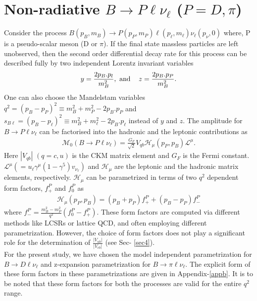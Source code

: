 \documentclass[a4paper,11pt]{article}
\begin{document}
\section{Non-radiative $B\to P\ell\nu_{\ell}$ ($P=D,\pi$)}
	\label{sec2}
	Consider the process $B(p_{B},m_{B})\to P(p_{P},m_{P}) \ell(p_{\ell},m_{\ell}) \nu_{\ell}(p_{\nu},0)$ where, P is a pseudo-scalar meson (D or $\pi$). If the final state massless particles are left unobserved, then the second order differential decay rate for this process can be described fully by two independent Lorentz invariant variables
	\begin{eqnarray}
	y=\frac{2 p_{B}.p_{l}}{m_{B}^{2}}, \text{  and  }\hspace{0.3cm}  z=\frac{2 p_{B}.p_{P}}{m_{B}^{2}}.
	\label{eqn1}
	\end{eqnarray}
	One can also choose the Mandelstam variables $q^{2}=(p_{B}-p_{P})^{2}\equiv m_{B}^{2}+m_{P}^{2}-2 p_{B}.p_{P}$ and $s_{B\ell}=(p_{B}-p_{\ell})^{2}\equiv m_{B}^{2}+m_{\ell}^{2}-2 p_{B}.p_{\ell}$ instead of $y$ and $z$. The amplitude for $B\rightarrow P \ell \nu_\ell $ can be factorised into the hadronic and the leptonic contributions as
	\begin{eqnarray}
	\mathcal{M}_{0}(B\to P\ell\nu_{\ell})=\frac{G_{F}}{\sqrt{2}}V_{qb}\mathcal{H}_{\mu}(p_{P},p_{B})\mathcal{L}^{\mu} .
	\end{eqnarray}
	Here $|V_{qb}|$ $(q={c,u})$ is the CKM matrix element and $G_{F}$ is the Fermi constant. $\mathcal{L}^{\mu}(=u_{\ell}\gamma^{\mu}(1-\gamma^{5})v_{\nu_{\ell}})$ and $\mathcal{H}_\mu$ are the leptonic and the hadronic matrix elements, respectively. $\mathcal{H}_{\mu}$ can be parametrized in terms of two $q^{2}$ dependent form factors, $f_{+}^{P}$ and $f_{0}^{P}$ as
	\begin{eqnarray}
	\mathcal{H}_{\mu}(p_{P},p_{B})=(p_{B}+p_{P}) f_{+}^{P} +(p_{B} - p_{P}) f_{-}^{P}
	\end{eqnarray} 
	where $f_{-}^{P}=\frac{m_{B}^{2}-m_{P}^{2}}{q^{2}}(f_{0}^{P} - f_{+}^{P})$. These form factors are computed via different methods like
	LCSRs or lattice QCD, and often 
        employing different parametrization. However, the choice of form factors does not play a significant role for the determination of $\frac{|V_{ub}|}{|V_{cb}|}$ (see Sec- \ref{sec4}). \\
For the present study, we have chosen the model independent parametrization for $B\to D \ell \nu_{\ell}$ and z-expansion parametrization for $B\to \pi \ell \nu_{\ell}$. The explicit form of these form factors in these parametrizations are given in Appendix-\ref{appb}. It is to be noted that these form factors for both the processes are valid for the entire $q^2$ range.
\end{document}
